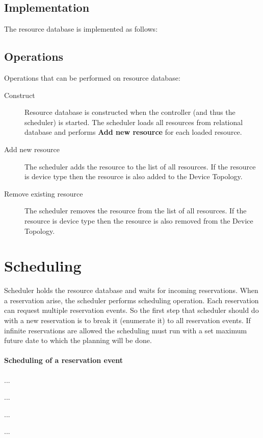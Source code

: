 \subsection{Implementation}

The resource database is implemented as follows:


\subsection{Operations}

Operations that can be performed on resource database:

\begin{description}
\item[Construct]
Resource database is constructed when the controller (and thus the scheduler) 
is started. The scheduler loads all resources from relational database and 
performs \textbf{Add new resource} for each loaded resource.

\item[Add new resource]
The scheduler adds the resource to the list of all resources. If the resource 
is device type then the resource is also added to the Device Topology.

\item[Remove existing resource]
The scheduler removes the resource from the list of all resources. If the 
resource is device type then the resource is also removed from the Device 
Topology.
\end{description}

\section{Scheduling}

Scheduler holds the resource database and waits for incoming reservations. When a reservation arise, the scheduler performs scheduling operation. Each reservation can request multiple reservation events. So the first step that
scheduler should do with a new reservation is to break it (enumerate it) to
all reservation events. If infinite reservations are allowed the scheduling must run with a set maximum future date to which the planning will be done.

\paragraph{Scheduling of a reservation event}
{
\renewcommand{\labelenumi}{\arabic{enumi}.}
\renewcommand{\labelenumii}{\arabic{enumi}.\arabic{enumii}}
\begin{compactenum}
\item ...
  \begin{compactenum}
  \item ...
  \item ...
  \end{compactenum}
\item ...
\end{compactenum}
}

